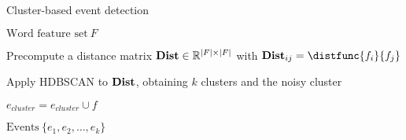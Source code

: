 \begin{algorithm}[H]
\begin{algorithmic}[1]
\caption{Cluster-based event detection}
\Input $\text{Word feature set} ~ F$

\State Precompute a distance matrix $\mathbf{Dist} \in \mathbb{R}^{\left\vert F \right\vert \times \left\vert F \right\vert}$ with $\distmat_{ij} = \distfunc{f_{i}}{f_{j}}$

\State Apply HDBSCAN to $\mathbf{Dist}$, obtaining $k$ clusters and the noisy cluster

		\State $e_{cluster} = e_{cluster} \cup f$
	\EndIf
\EndFor

\Output $\text{Events} ~ \{ e_{1}, e_{2}, \dots, e_{k} \}$
\end{algorithmic}
\end{algorithm}
